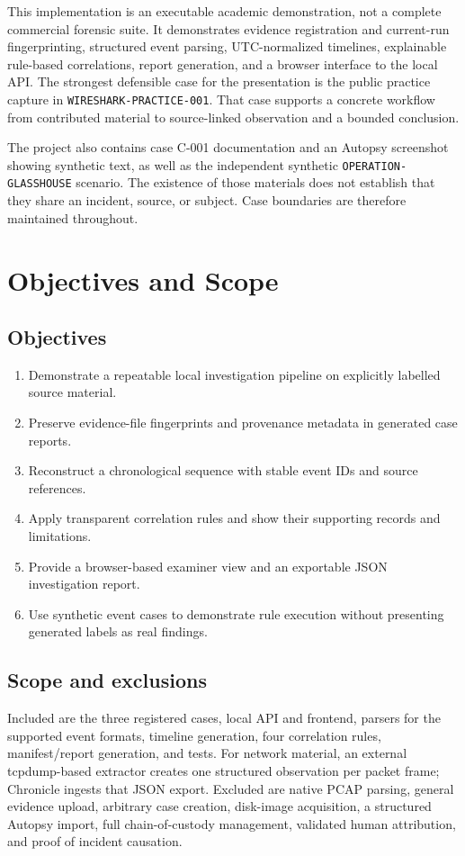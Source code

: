 \documentclass[12pt,a4paper]{report}
\newcommand{\caseid}[1]{\texttt{#1}}
\begin{document}
This implementation is an executable academic demonstration, not a complete commercial forensic suite. It demonstrates evidence registration and current-run fingerprinting, structured event parsing, UTC-normalized timelines, explainable rule-based correlations, report generation, and a browser interface to the local API. The strongest defensible case for the presentation is the public practice capture in \caseid{WIRESHARK-PRACTICE-001}. That case supports a concrete workflow from contributed material to source-linked observation and a bounded conclusion.

The project also contains case C-001 documentation and an Autopsy screenshot showing synthetic text, as well as the independent synthetic \caseid{OPERATION-GLASSHOUSE} scenario. The existence of those materials does not establish that they share an incident, source, or subject. Case boundaries are therefore maintained throughout.

\chapter{Objectives and Scope}
\section{Objectives}
\begin{enumerate}[leftmargin=1.2cm]
\item Demonstrate a repeatable local investigation pipeline on explicitly labelled source material.
\item Preserve evidence-file fingerprints and provenance metadata in generated case reports.
\item Reconstruct a chronological sequence with stable event IDs and source references.
\item Apply transparent correlation rules and show their supporting records and limitations.
\item Provide a browser-based examiner view and an exportable JSON investigation report.
\item Use synthetic event cases to demonstrate rule execution without presenting generated labels as real findings.
\end{enumerate}

\section{Scope and exclusions}
Included are the three registered cases, local API and frontend, parsers for the supported event formats, timeline generation, four correlation rules, manifest/report generation, and tests. For network material, an external tcpdump-based extractor creates one structured observation per packet frame; Chronicle ingests that JSON export. Excluded are native PCAP parsing, general evidence upload, arbitrary case creation, disk-image acquisition, a structured Autopsy import, full chain-of-custody management, validated human attribution, and proof of incident causation.
\end{document}

